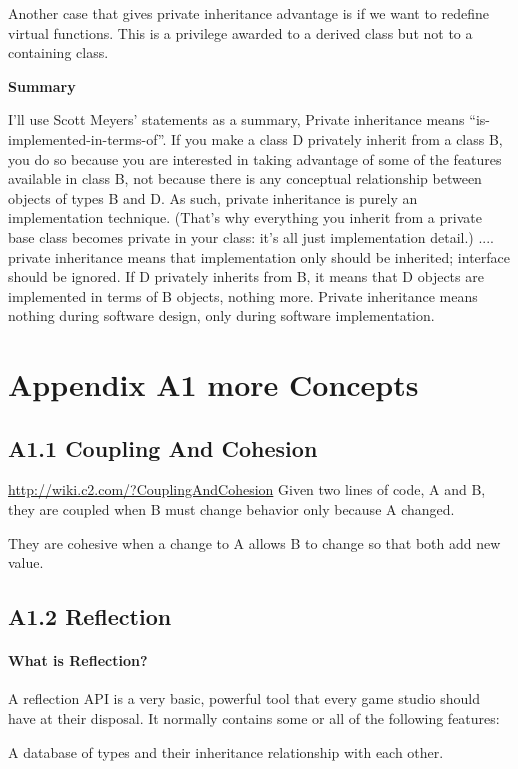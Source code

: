 \documentclass{book}
\begin{document}
Another case that gives private inheritance advantage is if we want to redefine virtual functions. This is a privilege awarded to a derived class but not to a containing class.

\textbf{Summary}

I'll use Scott Meyers' statements as a summary, Private inheritance means ``is-implemented-in-terms-of''.
If you make a class D privately inherit from a class B, you do so because you are interested in taking advantage of some of the features available in class B,
not because there is any conceptual relationship between objects of types B and D.
As such, private inheritance is purely an implementation technique.
(That's why everything you inherit from a private base class becomes private in your class: it's all just implementation detail.)
....
private inheritance means that implementation only should be inherited; interface should be ignored.
If D privately inherits from B, it means that D objects are implemented in terms of B objects, nothing more.
Private inheritance means nothing during software design, only during software implementation.

\section{Appendix A1 more Concepts}
\subsection{A1.1 Coupling And Cohesion}
\url{http://wiki.c2.com/?CouplingAndCohesion}
Given two lines of code, A and B, they are coupled when B must change behavior only because A changed.

They are cohesive when a change to A allows B to change so that both add new value. 
\subsection{A1.2 Reflection}\label{reflectionincpp}
\paragraph{What is Reflection?}\mbox{}
A reflection API is a very basic, powerful tool that every game studio should have at their disposal. It normally contains some or all of the following features:

    A database of types and their inheritance relationship with each other.
\end{document}
